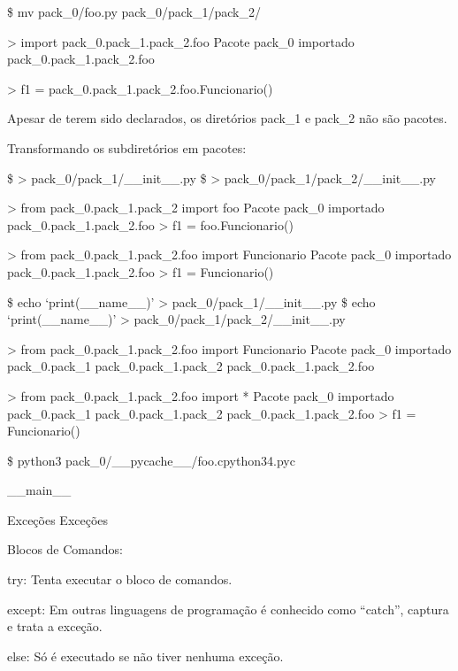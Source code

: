 \documentclass[letterpaper,10pt,brazil]{sphinxmanual}
\begin{document}
\$ mv pack\_0/foo.py pack\_0/pack\_1/pack\_2/

\textgreater{} import pack\_0.pack\_1.pack\_2.foo
Pacote pack\_0 importado
pack\_0.pack\_1.pack\_2.foo

\textgreater{} f1 = pack\_0.pack\_1.pack\_2.foo.Funcionario()

Apesar de terem sido declarados, os diretórios pack\_1 e pack\_2 não são pacotes.

Transformando os subdiretórios em pacotes:

\$ \textgreater{} pack\_0/pack\_1/\_\_init\_\_.py
\$ \textgreater{} pack\_0/pack\_1/pack\_2/\_\_init\_\_.py

\textgreater{} from pack\_0.pack\_1.pack\_2 import foo
Pacote pack\_0 importado
pack\_0.pack\_1.pack\_2.foo
\textgreater{} f1 = foo.Funcionario()

\textgreater{} from pack\_0.pack\_1.pack\_2.foo import Funcionario
Pacote pack\_0 importado
pack\_0.pack\_1.pack\_2.foo
\textgreater{} f1 = Funcionario()

\$ echo ‘print(\_\_name\_\_)’ \textgreater{} pack\_0/pack\_1/\_\_init\_\_.py
\$ echo ‘print(\_\_name\_\_)’ \textgreater{} pack\_0/pack\_1/pack\_2/\_\_init\_\_.py

\textgreater{} from pack\_0.pack\_1.pack\_2.foo import Funcionario
Pacote pack\_0 importado
pack\_0.pack\_1
pack\_0.pack\_1.pack\_2
pack\_0.pack\_1.pack\_2.foo

\textgreater{} from pack\_0.pack\_1.pack\_2.foo import *
Pacote pack\_0 importado
pack\_0.pack\_1
pack\_0.pack\_1.pack\_2
pack\_0.pack\_1.pack\_2.foo
\textgreater{} f1 = Funcionario()

\$ python3 pack\_0/\_\_pycache\_\_/foo.cpython\sphinxhyphen{}34.pyc

\_\_main\_\_

Exceções
Exceções
\sphinxstylestrong{****}


Blocos de Comandos:

try: Tenta executar o bloco de comandos.

except: Em outras linguagens de programação é conhecido como “catch”, captura e trata a exceção.

else: Só é executado se não tiver nenhuma exceção.
\end{document}
